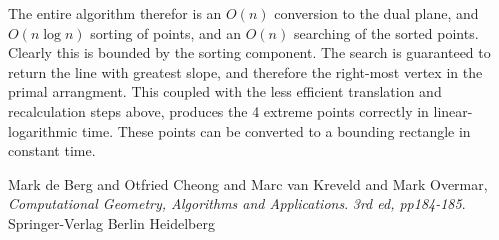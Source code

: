 \documentclass{article}
\begin{document}
The entire algorithm therefor is an $O(n)$ conversion to the dual plane, and $O(n \log n)$ sorting of points, and an $O(n)$ searching of the sorted points.
Clearly this is bounded by the sorting component.
The search is guaranteed to return the line with greatest slope, and therefore the right-most vertex in the primal arrangment.
This coupled with the less efficient translation and recalculation steps above, produces the 4 extreme points correctly in linear-logarithmic time.
These points can be converted to a bounding rectangle in constant time.

\begin{thebibliography}{9}

  Mark de Berg and Otfried Cheong and Marc van Kreveld and Mark Overmar,
  \emph{Computational Geometry, Algorithms and Applications}.
  \emph{3rd ed, pp184-185}.
  Springer-Verlag Berlin Heidelberg
  
\end{thebibliography}
\end{document}
